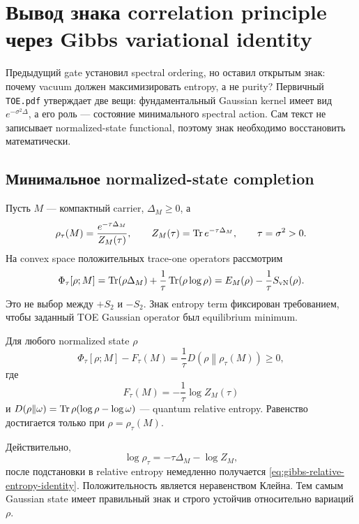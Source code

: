 \chapter{Вывод знака correlation principle через Gibbs variational identity}

Предыдущий gate установил spectral ordering, но оставил открытым знак:
почему vacuum должен максимизировать entropy, а не purity? Первичный
\texttt{TOE.pdf} утверждает две вещи: фундаментальный Gaussian kernel имеет
вид \(e^{-\sigma^2\Delta}\), а его роль --- состояние минимального spectral
action. Сам текст не записывает normalized-state functional, поэтому знак
необходимо восстановить математически.

\section{Минимальное normalized-state completion}

Пусть \(M\) --- компактный carrier, \(\Delta_M\ge0\), а
\begin{equation}
 \rho_\tau(M)=\frac{e^{-\tau\Delta_M}}{Z_M(\tau)},
 \qquad
 Z_M(\tau)=\operatorname{Tr} e^{-\tau\Delta_M},
 \qquad \tau=\sigma^2>0.
\end{equation}
На convex space положительных trace-one operators рассмотрим
\begin{equation}
 \Phi_\tau[\rho;M]
 =\operatorname{Tr}(\rho\Delta_M)
 +\frac1\tau\operatorname{Tr}(\rho\log\rho)
 =E_M(\rho)-\frac1\tau S_{\rm vN}(\rho).
 \label{eq:gibbs-carrier-functional}
\end{equation}
Это не выбор между \(+S_2\) и \(-S_2\). Знак entropy term фиксирован
требованием, чтобы заданный TOE Gaussian operator был equilibrium minimum.

\begin{theorem}
Для любого normalized state \(\rho\)
\begin{equation}
 \Phi_\tau[\rho;M]-F_\tau(M)
 =\frac1\tau
 D\!\left(\rho\middle\|\rho_\tau(M)\right)\ge0,
 \label{eq:gibbs-relative-entropy-identity}
\end{equation}
где
\begin{equation}
 F_\tau(M)=-\frac1\tau\log Z_M(\tau)
\end{equation}
и \(D(\rho\|\omega)=\operatorname{Tr}\rho(\log\rho-\log\omega)\) --- quantum relative
entropy. Равенство достигается только при \(\rho=\rho_\tau(M)\).
\end{theorem}

Действительно,
\begin{equation}
 \log\rho_\tau=-\tau\Delta_M-\log Z_M,
\end{equation}
после подстановки в relative entropy немедленно получается
\eqref{eq:gibbs-relative-entropy-identity}. Положительность является
неравенством Клейна. Тем самым Gaussian state имеет правильный знак и
строго устойчив относительно вариаций \(\rho\).

